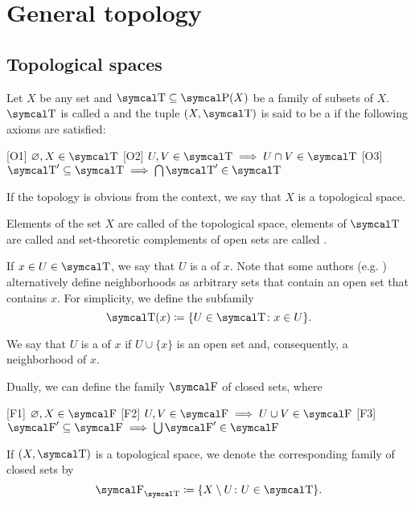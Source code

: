 \section{General topology}\label{sec:general_topology}
\subsection{Topological spaces}\label{subsec:topological_spaces}

\begin{definition}\label{def:topological_space}\cite[11]{Engelking1989}
  Let \( X \) be any set and \( \CT \subseteq \Power(X) \) be a family of subsets of \( X \). \( \CT \) is called a  and the tuple \( (X, \CT) \) is said to be a  if the following axioms are satisfied:
  \begin{description}
    [O1] \( \varnothing, X \in \CT \)
    [O2] \( U, V \in \CT \implies U \cap V \in \CT \)
    [O3] \( \CT' \subseteq \CT \implies \bigcap \CT' \in \CT \)
  \end{description}

  If the topology is obvious from the context, we say that \( X \) is a topological space.

  Elements of the set \( X \) are called  of the topological space, elements of \( \CT \) are called  and set-theoretic complements of open sets are called .

  If \( x \in U \in \CT \), we say that \( U \) is a  of \( x \). Note that some authors (e.g. \cite[38]{Kelley1955}) alternatively define neighborhoods as arbitrary sets that contain an open set that contains \( x \). For simplicity, we define the subfamily
  \begin{equation*}
    \CT(x) \coloneqq \{ U \in \CT \colon x \in U \}.
  \end{equation*}

  We say that \( U \) is a  of \( x \) if \( U \cup \{ x \} \) is an open set and, consequently, a neighborhood of \( x \).

  Dually, we can define the family \( \CF \) of closed sets, where
  \begin{description}
    [F1] \( \varnothing, X \in \CF \)
    [F2] \( U, V \in \CF \implies U \cup V \in \CF \)
    [F3] \( \CF' \subseteq \CF \implies \bigcup \CF' \in \CF \)
  \end{description}

  If \( (X, \CT) \) is a topological space, we denote the corresponding family of closed sets by
  \begin{equation*}
    \CF_{\CT} \coloneqq \{ X \setminus U \colon U \in \CT \}.
  \end{equation*}
\end{definition}

